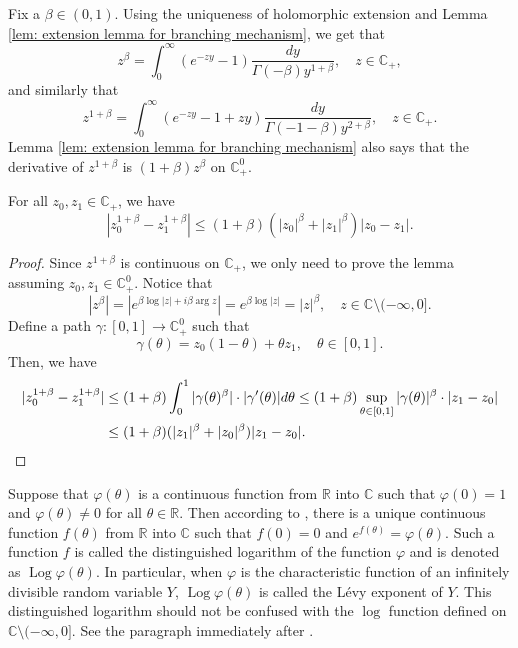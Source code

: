 \documentclass[EJP]{ejpecp} %
\begin{document}
	Fix a $\beta \in (0,1)$.
	Using the uniqueness of holomorphic extension and Lemma \ref{lem: extension lemma for branching mechanism}, we get that
\[
	z^{\beta}
	= \int_0^\infty (e^{-zy}-1) \frac{dy}{\Gamma(-\beta)y^{1+\beta}},
  	\quad z\in \mathbb C_+,
\]
	and similarly that
\begin{equation}
\label{eq: stable branching on C+}
  	z^{1+\beta}
  	= \int_0^\infty (e^{-zy}-1+zy)\frac{dy}{\Gamma(-1-\beta)y^{2+\beta}},
  	\quad z\in \mathbb C_+.
\end{equation}
	Lemma \ref{lem: extension lemma for branching mechanism} also says that the derivative of $z^{1+\beta}$ is $(1+\beta)z^{\beta}$ on $\mathbb C^0_+$.

\begin{lemma}
\label{lem: Lip of power function}
	For all $z_0,z_1 \in \mathbb C_+$, we have
\begin{equation}
	\label{eq: Lip of power function}
	|z_0^{1+\beta} - z_1^{1+\beta}|
	\leq (1+\beta)(|z_0|^{\beta}+|z_1|^{\beta})|z_0 - z_1|.
\end{equation}
\end{lemma}

\begin{proof}
	Since $z^{1+\beta}$ is continuous on $\mathbb C_+$, we only need to prove the lemma assuming $z_0,z_1 \in \mathbb C^0_+$.
	Notice that
\begin{equation}
\label{eq: upper bound for beta power of z}
    |z^\beta|
    = |e^{\beta \log |z| +i\beta \operatorname {arg}z}| = e^{\beta \log |z|} = |z|^\beta,
    \quad z \in \mathbb C\setminus (-\infty, 0].
\end{equation}
Define a path $\gamma: [0,1] \to \mathbb C^0_+$ such that
\[
    \gamma(\theta)
    = z_0 (1-\theta) + \theta z_1,
    \quad \theta \in [0,1].
\]
	Then, we have
\begin{align}
    |z_0^{1+\beta} - z_1^{1+\beta}|
    & \leq (1+\beta) \int_0^1 |\gamma(\theta)^{\beta}|\cdot |\gamma'(\theta)|d\theta
   	\leq (1+\beta)  \sup_{\theta \in [0,1]} |\gamma(\theta)|^{\beta} \cdot |z_1-z_0| \\
    & \leq (1+\beta)  ( |z_1|^{\beta}+|z_0|^{\beta} ) |z_1-z_0|.
\qedhere
\end{align}
\end{proof}

	Suppose that $\varphi(\theta)$ is a continuous function from $\mathbb R$ into $\mathbb C$ such that $\varphi(0) = 1$ and $\varphi(\theta) \neq 0$ for all $\theta \in \mathbb R$.
	Then according to \cite[Lemma 7.6]{Sato2013Levy}, there is a unique continuous function $f(\theta)$ from $\mathbb R$ into $\mathbb C$ such that $f(0) = 0$ and $e^{f(\theta)} = \varphi(\theta)$.
	Such a function $f$ is called the distinguished logarithm of the function $\varphi$ and is denoted as $\operatorname{Log} \varphi(\theta)$.
	In particular, when $\varphi$ is the characteristic function of an infinitely divisible random variable $Y$,  $\operatorname{Log} \varphi(\theta)$ is called the L\'evy exponent of $Y$.
	This distinguished logarithm should not be confused with the $\log$ function defined on $\mathbb C\setminus (-\infty, 0]$.
	See the paragraph immediately after \cite[Lemma 7.6]{Sato2013Levy}.
\end{document}
